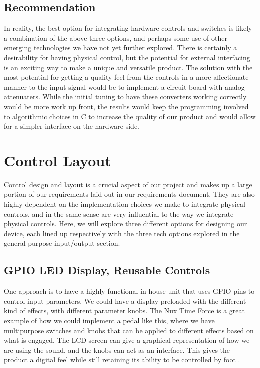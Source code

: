 \documentclass[onecolumn, draftclsnofoot,10pt, compsoc]{IEEEtran}
\begin{document}
\subsection{Recommendation}
    In reality, the best option for integrating hardware controls and switches is likely a combination of the above three options, and perhaps some use of other emerging technologies we have not yet further explored. There is certainly a desirability for having physical control, but the potential for external interfacing is an exciting way to make a unique and versatile product. The solution with the most potential for getting a quality feel from the controls in a more affectionate manner to the input signal would be to implement a circuit board with analog attenuaters. While the initial tuning to have these converters working correctly would be more work up front, the results would keep the programming involved to algorithmic choices in C to increase the quality of our product and would allow for a simpler interface on the hardware side. 

\section{Control Layout}
	Control design and layout is a crucial aspect of our project and makes up a large portion of our requirements laid out in our requirements document. They are also highly dependent on the implementation choices we make to integrate physical controls, and in the same sense are very influential to the way we integrate physical controls. Here, we will explore three different options for designing our device, each lined up respectively with the three tech options explored in the general-purpose input/output section. 
\subsection{GPIO LED Display, Reusable Controls}
	One approach is to have a highly functional in-house unit that uses GPIO pins to control input parameters. We could have a display preloaded with the different kind of effects, with different parameter knobs. The Nux Time Force is a great example of how we could implement a pedal like this, where we have multipurpose switches and knobs that can be applied to different effects based on what is engaged. The LCD screen can give a graphical representation of how we are using the sound, and the knobs can act as an interface. This gives the product a digital feel while still retaining its ability to be controlled by foot \cite{NUX}.
\end{document}
